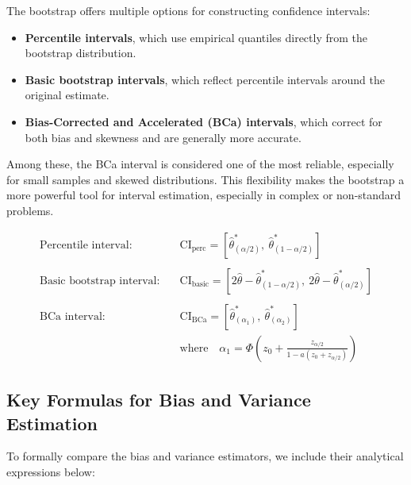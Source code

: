 \documentclass{article}
\begin{document}
The bootstrap offers multiple options for constructing confidence intervals:

\begin{itemize}
  \item \textbf{Percentile intervals}, which use empirical quantiles directly from the bootstrap distribution.
  \item \textbf{Basic bootstrap intervals}, which reflect percentile intervals around the original estimate.
  \item \textbf{Bias-Corrected and Accelerated (BCa) intervals}, which correct for both bias and skewness and are generally more accurate.
\end{itemize}

Among these, the BCa interval is considered one of the most reliable, especially for small samples and skewed distributions. This flexibility makes the bootstrap a more powerful tool for interval estimation, especially in complex or non-standard problems.
\\

\begin{tcolorbox}[title=Formulas for Bootstrap Confidence Intervals]
\begin{align*}
\text{Percentile interval:} \quad & \text{CI}_{\text{perc}} = \left[ \hat{\theta}^{*}_{(\alpha/2)},\ \hat{\theta}^{*}_{(1 - \alpha/2)} \right] \\\\[1ex]
\text{Basic bootstrap interval:} \quad & \text{CI}_{\text{basic}} = \left[ 2\hat{\theta} - \hat{\theta}^{*}_{(1 - \alpha/2)},\ 2\hat{\theta} - \hat{\theta}^{*}_{(\alpha/2)} \right] \\\\[1ex]
\text{BCa interval:} \quad & \text{CI}_{\text{BCa}} = \left[ \hat{\theta}^{*}_{(\alpha_1)},\ \hat{\theta}^{*}_{(\alpha_2)} \right] \\
& \text{where} \quad \alpha_1 = \Phi \left( z_0 + \frac{z_{\alpha/2}}{1 - a(z_0 + z_{\alpha/2})} \right)
\end{align*}
\end{tcolorbox}


\newpage

\subsection{Key Formulas for Bias and Variance Estimation}
To formally compare the bias and variance estimators, we include their analytical expressions below:
\end{document}
